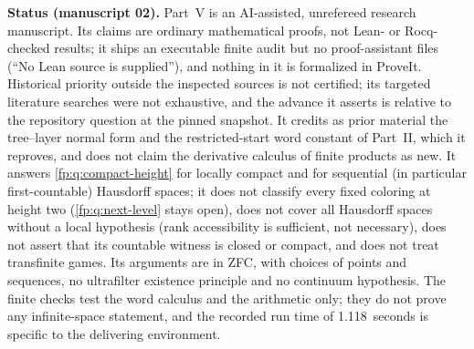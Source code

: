 \documentclass[11pt,letterpaper]{article}
\numberwithin{equation}{section}
\theoremstyle{definition}
\theoremstyle{remark}
\theoremstyle{definition}
\begin{document}
\begin{resultbox}
\textbf{Status (manuscript 02).} Part~V is an AI-assisted, unrefereed
research manuscript. Its claims are ordinary mathematical proofs, not
Lean- or Rocq-checked results; it ships an executable finite audit but no
proof-assistant files (``No Lean source is supplied''), and nothing in it is
formalized in ProveIt. Historical priority outside the inspected sources is
not certified; its targeted literature searches were not exhaustive, and the
advance it asserts is relative to the repository question at the pinned
snapshot. It credits as prior material the tree--layer normal form and the
restricted-start word constant of Part~II, which it reproves, and does not
claim the derivative calculus of finite products as new. It answers
\cref{fp:q:compact-height} for locally compact and for sequential
(in particular first-countable) Hausdorff spaces; it does not classify every
fixed coloring at height two (\cref{fp:q:next-level} stays open), does not
cover all Hausdorff spaces without a local hypothesis (rank accessibility is
sufficient, not necessary), does not assert that its countable witness is
closed or compact, and does not treat transfinite games. Its arguments are
in ZFC, with choices of points and sequences, no ultrafilter existence
principle and no continuum hypothesis. The finite checks test the word
calculus and the arithmetic only; they do not prove any infinite-space
statement, and the recorded run time of 1.118~seconds is specific to the
delivering environment.
\end{resultbox}
\end{document}
